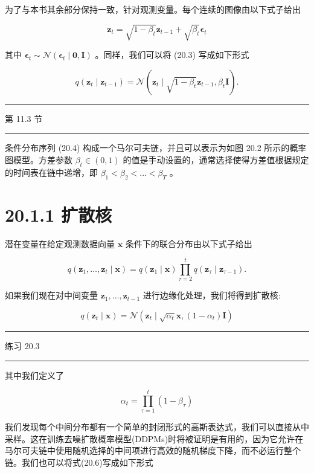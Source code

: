 \documentclass[10pt]{article}
\newcommand{\HRule}{\begin{center}\rule{0.9\linewidth}{0.2mm}\end{center}}
\begin{document}
为了与本书其余部分保持一致，针对观测变量。每个连续的图像由以下式子给出

\[
{\mathbf{z}}_{t} = \sqrt{1 - {\beta }_{t}}{\mathbf{z}}_{t - 1} + \sqrt{{\beta }_{t}}{\mathbf{\epsilon }}_{t} \tag{20.3}
\]

其中 \({\mathbf{\epsilon }}_{t} \sim  \mathcal{N}\left( {{\mathbf{\epsilon }}_{t} \mid  \mathbf{0},\mathbf{I}}\right)\) 。同样，我们可以将 (20.3) 写成如下形式

\[
q\left( {{\mathbf{z}}_{t} \mid  {\mathbf{z}}_{t - 1}}\right)  = \mathcal{N}\left( {{\mathbf{z}}_{t} \mid  \sqrt{1 - {\beta }_{t}}{\mathbf{z}}_{t - 1},{\beta }_{t}\mathbf{I}}\right) . \tag{20.4}
\]

\HRule

第 11.3 节

\HRule

条件分布序列 (20.4) 构成一个马尔可夫链，并且可以表示为如图 20.2 所示的概率图模型。方差参数 \({\beta }_{t} \in  \left( {0,1}\right)\) 的值是手动设置的，通常选择使得方差值根据规定的时间表在链中递增，即 \({\beta }_{1} < {\beta }_{2} < \ldots  < {\beta }_{T}\) 。

\section*{20.1.1 扩散核}

潜在变量在给定观测数据向量 \(\mathbf{x}\) 条件下的联合分布由以下式子给出

\[
q\left( {{\mathbf{z}}_{1},\ldots ,{\mathbf{z}}_{t} \mid  \mathbf{x}}\right)  = q\left( {{\mathbf{z}}_{1} \mid  \mathbf{x}}\right) \mathop{\prod }\limits_{{\tau  = 2}}^{t}q\left( {{\mathbf{z}}_{\tau } \mid  {\mathbf{z}}_{\tau  - 1}}\right) . \tag{20.5}
\]

如果我们现在对中间变量 \({\mathbf{z}}_{1},\ldots ,{\mathbf{z}}_{t - 1}\) 进行边缘化处理，我们将得到扩散核:

\[
q\left( {{\mathbf{z}}_{t} \mid  \mathbf{x}}\right)  = \mathcal{N}\left( {{\mathbf{z}}_{t} \mid  \sqrt{{\alpha }_{t}}\mathbf{x},\left( {1 - {\alpha }_{t}}\right) \mathbf{I}}\right)  \tag{20.6}
\]

\HRule

练习 20.3

\HRule

其中我们定义了

\[
{\alpha }_{t} = \mathop{\prod }\limits_{{\tau  = 1}}^{t}\left( {1 - {\beta }_{\tau }}\right)  \tag{20.7}
\]

我们发现每个中间分布都有一个简单的封闭形式的高斯表达式，我们可以直接从中采样。这在训练去噪扩散概率模型(DDPMs)时将被证明是有用的，因为它允许在马尔可夫链中使用随机选择的中间项进行高效的随机梯度下降，而不必运行整个链。我们也可以将式(20.6)写成如下形式
\end{document}
